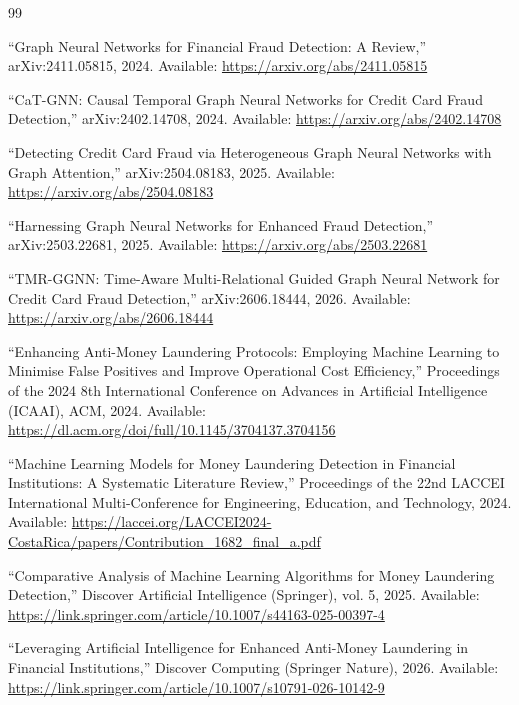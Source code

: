 \begin{thebibliography}{99}

``Graph Neural Networks for Financial Fraud Detection: A Review,'' arXiv:2411.05815, 2024. Available: \url{https://arxiv.org/abs/2411.05815}

``CaT-GNN: Causal Temporal Graph Neural Networks for Credit Card Fraud Detection,'' arXiv:2402.14708, 2024. Available: \url{https://arxiv.org/abs/2402.14708}

``Detecting Credit Card Fraud via Heterogeneous Graph Neural Networks with Graph Attention,'' arXiv:2504.08183, 2025. Available: \url{https://arxiv.org/abs/2504.08183}

``Harnessing Graph Neural Networks for Enhanced Fraud Detection,'' arXiv:2503.22681, 2025. Available: \url{https://arxiv.org/abs/2503.22681}

``TMR-GGNN: Time-Aware Multi-Relational Guided Graph Neural Network for Credit Card Fraud Detection,'' arXiv:2606.18444, 2026. Available: \url{https://arxiv.org/abs/2606.18444}

``Enhancing Anti-Money Laundering Protocols: Employing Machine Learning to Minimise False Positives and Improve Operational Cost Efficiency,'' Proceedings of the 2024 8th International Conference on Advances in Artificial Intelligence (ICAAI), ACM, 2024. Available: \url{https://dl.acm.org/doi/full/10.1145/3704137.3704156}

``Machine Learning Models for Money Laundering Detection in Financial Institutions: A Systematic Literature Review,'' Proceedings of the 22nd LACCEI International Multi-Conference for Engineering, Education, and Technology, 2024. Available: \url{https://laccei.org/LACCEI2024-CostaRica/papers/Contribution_1682_final_a.pdf}

``Comparative Analysis of Machine Learning Algorithms for Money Laundering Detection,'' Discover Artificial Intelligence (Springer), vol. 5, 2025. Available: \url{https://link.springer.com/article/10.1007/s44163-025-00397-4}

``Leveraging Artificial Intelligence for Enhanced Anti-Money Laundering in Financial Institutions,'' Discover Computing (Springer Nature), 2026. Available: \url{https://link.springer.com/article/10.1007/s10791-026-10142-9}


\end{thebibliography}
